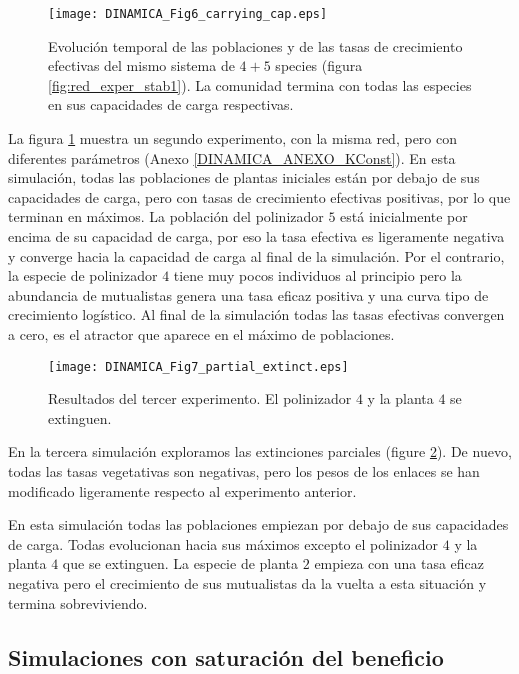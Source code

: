 \begin{figure}[ht!]
\centering
\texttt{[image: DINAMICA\_Fig6\_carrying\_cap.eps]}
\caption {Evolución temporal de las poblaciones y de las tasas de crecimiento efectivas del mismo sistema de $4+5$ species (figura \ref{fig:red_exper_stab1}). La comunidad termina con todas las especies en sus capacidades de carga respectivas.}
\label{fig:exper_carrying_cap}
\end{figure}

La figura \ref{fig:exper_carrying_cap} muestra un segundo experimento, con la misma red, pero con diferentes parámetros (Anexo \ref{DINAMICA_ANEXO_KConst}). En esta simulación, todas las poblaciones de plantas iniciales están por debajo de sus capacidades de carga, pero con tasas de crecimiento efectivas positivas, por lo que terminan en máximos. La población del polinizador $5$ está inicialmente por encima de su capacidad de carga, por eso la tasa efectiva es ligeramente negativa y converge hacia la capacidad de carga al final de la simulación. Por el contrario, la especie de polinizador $4$ tiene muy pocos individuos al principio pero la abundancia de mutualistas genera una tasa eficaz positiva y una curva tipo de crecimiento logístico. Al final de la simulación todas las tasas efectivas convergen a cero, es el atractor que aparece en el máximo de poblaciones.

\begin{figure}[h!]
\centering
\texttt{[image: DINAMICA\_Fig7\_partial\_extinct.eps]}
\caption {Resultados del tercer experimento. El polinizador $4$ y la planta $4$ se extinguen.}
\label{fig:exper_stab2}
\end{figure}

En la tercera simulación exploramos las extinciones parciales (figure \ref{fig:exper_stab2}). De nuevo, todas las tasas vegetativas son negativas, pero los pesos de los enlaces se han modificado ligeramente respecto al experimento anterior.

En esta simulación todas las poblaciones empiezan por debajo de sus capacidades de carga. Todas evolucionan hacia sus máximos excepto el polinizador $4$ y la planta $4$ que se extinguen. La especie de planta $2$ empieza con una tasa eficaz negativa pero el crecimiento de sus mutualistas da la vuelta a esta situación y termina sobreviviendo.

\subsection{Simulaciones con saturación del beneficio}
\label{results_K_constante}

